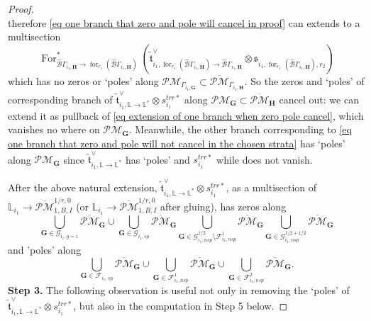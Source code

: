 \documentclass[11pt]{amsart}
\theoremstyle{definition}
\theoremstyle{remark}
\newcommand{\oPMb}{{\overline{\mathcal{PM}}}}
\newcommand{\nontilde}{}
\newcommand{\<}{\left<}
\renewcommand{\>}{\right>}
\numberwithin{equation}{section}
\begin{document}
\begin{proof}
\begin{equation*}
        \end{equation*}
        therefore %
\eqref{eq one branch that zero and pole will cancel in proof} can extends to a multisection
        \begin{equation}\label{eq extension of one branch when zero pole cancel}
        \operatorname{For}^*_{\hat{\mathcal B}\Gamma_{i_1,\bm{H}} \to \operatorname{for}_{r_1}(\hat{\mathcal B}\Gamma_{i_1,\bm{H}})}
        (\tilde{\mathfrak t}^\vee_{i_1,\operatorname{for}_{r_1}(\hat{\mathcal B}\Gamma_{i_1,\bm{H}})\to\hat{\mathcal B}\Gamma_{i_1,\bm{H}}} \otimes \mathfrak s_{i_1,\operatorname{for}_{r_1}(\hat{\mathcal B}\Gamma_{i_1,\bm{H}}),r_2})
        \end{equation}
        which has no zeros or `poles' along $\mathcal{PM}_{\Gamma_{i_1,\bm{G}}}\subset \oPMb_{\Gamma_{i_1,\bm{H}}}$. So the zeros and `poles' of corresponding branch of $\tilde{\mathfrak{t}}^{\vee}_{i_1,\mathbb L \to \mathbb L^*}\otimes
        \nontilde{s}^{trr*}_{i_1}$  along $\mathcal{PM}_{\bm{G}}\subset \oPMb_{\bm{H}}$ cancel out: we can extend it as pullback of \eqref{eq extension of one branch when zero pole cancel}, which vanishes no where on $\mathcal{PM}_{\bm{G}}$. Meanwhile, the other branch corresponding to \eqref{eq one branch that zero and pole will not cancel in the chosen strata} has `poles' along $\mathcal{PM}_{\bm{G}}$ since $\tilde{\mathfrak{t}}^{\vee}_{i_1,\mathbb L \to \mathbb L^*}$ has `poles' and $ \nontilde{s}^{trr*}_{i_1}$ while does not vanish.

        After the above natural extension, $\tilde{\mathfrak{t}}^{\vee}_{i_1,\mathbb L \to \mathbb L^*}\otimes \nontilde{s}^{trr*}_{i_1}$, as a multisection of  $\mathbb L_{i_1}\to \oPMb^{1/r,0}_{1,B,I}$ (or  $\mathbb L_{i_1}\to \oPMb^{1/r,0}_{1,B,I}$ after gluing),  has zeros along 
        $$
        \bigcup_{\bm{G}\in \bm{\mathcal G}_{i_1,g=1} } \oPMb_{\bm{G}} \cup \bigcup_{\bm{G}\in  \bm{\mathcal G}_{i_1,sp} } \oPMb_{\bm{G}} \bigcup_{\bm{G}\in  \bm{\mathcal G}^{1/2}_{i_1,nsp} \setminus \bm{\mathcal F}^1_{i_1,nsp}} \oPMb_{\bm{G}} \bigcup_{\bm{G}\in \bm{\mathcal G}^{1/2+1/2}_{i_1,nsp}} \oPMb_{\bm{G}}
        $$
        and 'poles' along
        $$
        \bigcup_{\mathbf{G}\in \bm{\mathcal F}_{i_1,sp}} \oPMb_{\mathbf{G}} \cup \bigcup_{\mathbf{G}\in \bm{\mathcal F}^1_{i_1,nsp}} \oPMb_{\mathbf{G}} \cup \bigcup_{\mathbf{G}\in\bm{\mathcal F}^2_{i_1,nsp}} \oPMb_{\mathbf{G}}.
        $$
        \noindent\textbf{Step 3.} The following observation is useful  not only in removing the `poles' of $\tilde{\mathfrak{t}}^{\vee}_{i_1,\mathbb L \to \mathbb L^*}\otimes \nontilde{s}^{trr*}_{i_1}$, but also in the computation in Step 5 below.
        

\end{proof}
\end{document}
